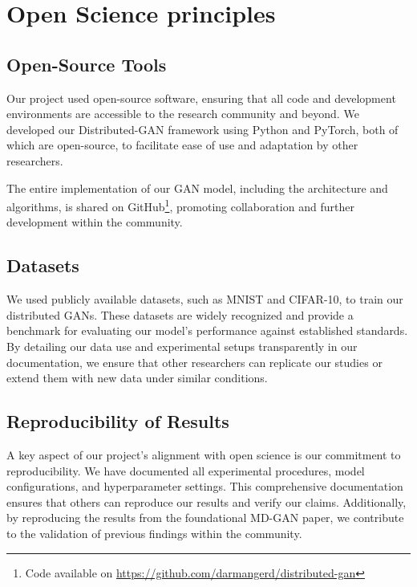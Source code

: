 \chapter{Open Science principles}

\section{Open-Source Tools}
Our project used open-source software, ensuring that all code and development environments are accessible to the research community and beyond. We developed our Distributed-GAN framework using Python and PyTorch, both of which are open-source, to facilitate ease of use and adaptation by other researchers. 

The entire implementation of our GAN model, including the architecture and algorithms, is shared on GitHub\footnote{Code available on \url{https://github.com/darmangerd/distributed-gan}}, promoting collaboration and further development within the community.


\section{Datasets}
We used publicly available datasets, such as MNIST and CIFAR-10, to train our distributed GANs. These datasets are widely recognized and provide a benchmark for evaluating our model's performance against established standards. By detailing our data use and experimental setups transparently in our documentation, we ensure that other researchers can replicate our studies or extend them with new data under similar conditions.


\section{Reproducibility of Results}
A key aspect of our project's alignment with open science is our commitment to reproducibility. We have documented all experimental procedures, model configurations, and hyperparameter settings. This comprehensive documentation ensures that others can reproduce our results and verify our claims. Additionally, by reproducing the results from the foundational MD-GAN paper, we contribute to the validation of previous findings within the community.